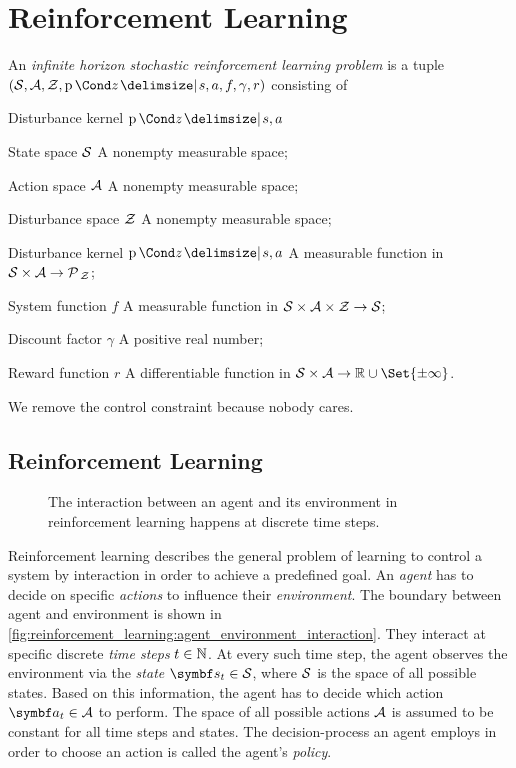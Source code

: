 \section{Reinforcement Learning}
\label{toc:bayesian_rl}
\parencite{bertsekas_stochastic_1978}

\begin{definition}
    An \emph{infinite horizon stochastic reinforcement learning problem} is a tuple $(\Sc, \Ac, \Zc, \Prob{z \given s, a}, f, \gamma, r)$ consisting of
    \begin{labeling}{Disturbance kernel $\Prob{z \given s, a}$\quad}
        \item[State space $\mathcal{S}$] A nonempty measurable space;
        \item[Action space $\mathcal{A}$] A nonempty measurable space;
        \item[Disturbance space $\mathcal{Z}$] A nonempty measurable space;
        \item[Disturbance kernel $\Prob{z \given s, a}$] A measurable function in $\mathcal{S} \times \mathcal{A} \to \operatorname{\mathcal{P}\mkern2mu}_{\mathcal{Z}}$;
        \item[System function $f$] A measurable function in  $\mathcal{S} \times \mathcal{A} \times \mathcal{Z} \to \mathcal{S}$;
        \item[Discount factor $\gamma$] A positive real number;
        \item[Reward function $r$] A differentiable function in $\Sc \times \Ac \to \Rb \cup \Set{\pm \infty}$.
    \end{labeling}
\end{definition}
We remove the control constraint because nobody cares.


\subsection{Reinforcement Learning}
\label{toc:bayesian_rl:bayesian_rl}
\begin{figure}[t]
    \centering
    
    \caption[Agent-environment interaction]{
        The interaction between an agent and its environment in reinforcement learning happens at discrete time steps.
    }
    \label{fig:bayesian_rl:agent_environment_interaction}
\end{figure}
Reinforcement learning describes the general problem of learning to control a system by interaction in order to achieve a predefined goal.
An \emph{agent} has to decide on specific \emph{actions} to influence their \emph{environment}.
The boundary between agent and environment is shown in \cref{fig:reinforcement_learning:agent_environment_interaction}.
They interact at specific discrete \emph{time steps} $t \in \mathbb{N}$.
At every such time step, the agent observes the environment via the \emph{state} $\mat{s}_t \in \Sc$, where $\mathcal{S}$ is the space of all possible states.
Based on this information, the agent has to decide which action $\mat{a}_t \in \Ac$ to perform.
The space of all possible actions $\mathcal{A}$ is assumed to be constant for all time steps and states.
The decision-process an agent employs in order to choose an action is called the agent's \emph{policy}.

